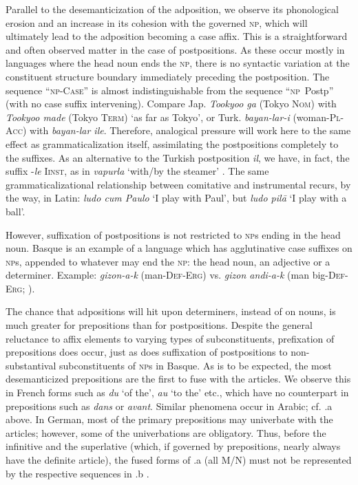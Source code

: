 Parallel to the desemanticization of the adposition, we observe its phonological erosion and an increase in its cohesion with the governed \textsc{np}, which will ultimately lead to the adposition becoming a case affix. This is a straightforward and often observed matter in the case of postpositions. As these occur mostly in languages where the head noun ends the \textsc{np}, there is no syntactic variation at the constituent structure boundary immediately preceding the postposition. The sequence ``\textsc{np}-\textsc{Case}'' is almost indistinguishable from the sequence ``\textsc{np}~Postp'' (with no case suffix intervening). Compare Jap. \textit{Tookyoo ga} (Tokyo \textsc{Nom}) with \textit{Tookyoo made} (Tokyo \textsc{Term}) `as far as Tokyo', or Turk. \textit{bayan-lar-i} (woman-\textsc{Pl-Acc}) with \textit{bayan-lar ile}. Therefore, analogical pressure will work here to the same effect as grammaticalization itself, assimilating the postpositions completely to the suffixes.\label{page89} As an alternative to the Turkish postposition \textit{il}, we have, in fact, the suffix -\textit{le} \textsc{Iinst}, as in \textit{vapurla} ‘with/by the steamer’ \citep[63]{Wendt1972}. The same grammaticalizational relationship between comitative and instrumental recurs, by the way, in Latin: \textit{ludo cum Paulo} ‘I play with Paul’, but \textit{ludo pil\=a} ‘I play with a ball’.

However, suffixation of postpositions is not restricted to \textsc{np}s ending in the head noun. Basque is an example of a language which has agglutinative case suffixes on \textsc{np}s, appended to whatever may end the \textsc{np}: the head noun, an adjective or a determiner. Example: \textit{gizon-a-k} (man-\textsc{Def-Erg}) vs. \textit{gizon andi-a-k} (man big-\textsc{Def-Erg}; \citealt[69]{Brettschneider1978}).

The chance that adpositions will hit upon determiners, instead of on nouns, is much greater for prepositions than for postpositions. Despite the general reluctance to affix elements to varying types of subconstituents, prefixation of prepositions does occur, just as does suffixation of postpositions to non-substantival subconstituents of \textsc{np}s in Basque. As is to be expected, the most desemanticized prepositions are the first to fuse with the articles. We observe this in French forms such as \textit{du} ‘of the’, \textit{au} ‘to the’ etc., which have no counterpart in prepositions such as \textit{dans} or \textit{avant}. Similar phenomena occur in Arabic; cf. .a above. In German, most of the primary prepositions may univerbate with the articles; however, some of the univerbations are obligatory. Thus, before the infinitive and the superlative (which, if governed by prepositions, nearly always have the definite article), the fused forms of .a (all M/N) must not be represented by the respective sequences in .b \citep[36]{Vater1979}.

